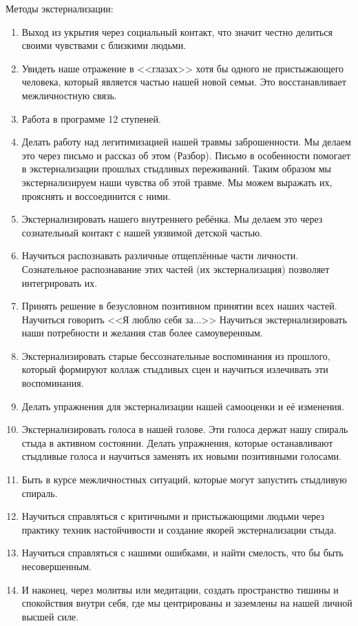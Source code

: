 \documentclass[10pt, fleqn]{article}
\begin{document}
Методы экстернализации:
\begin{enumerate}
\item Выход из укрытия через социальный контакт, что значит честно делиться своими чувствами с близкими людьми.
\item Увидеть наше отражение в <<глазах>> хотя бы одного не пристыжающего человека, который является частью нашей новой семьи. Это восстанавливает межличностную связь.
\item Работа в программе 12 ступеней.
\item Делать работу над легитимизацией нашей травмы заброшенности. Мы делаем это через письмо и рассказ об этом (Разбор). Письмо в особенности помогает в экстернализации прошлых стыдливых переживаний. Таким образом мы экстернализируем наши чувства об этой травме. Мы можем выражать их, прояснять и воссоединится с ними.
\item Экстернализировать нашего внутреннего ребёнка. Мы делаем это через сознательный контакт с нашей уязвимой детской частью. 
\item Научиться распознавать различные отщеплённые части личности. Сознательное распознавание этих частей (их экстернализация) позволяет интегрировать их.
\item Принять решение в безусловном позитивном принятии всех наших частей. Научиться говорить <<Я люблю себя за...>> Научиться экстернализировать наши потребности и желания став более самоуверенным.
\item Экстернализировать старые бессознательные воспоминания из прошлого, который формируют коллаж стыдливых сцен и научиться излечивать эти воспоминания.
\item Делать упражнения для экстернализации нашей самооценки и её изменения.
\item Экстернализировать голоса в нашей голове. Эти голоса держат нашу спираль стыда в активном состоянии. Делать упражнения, которые останавливают стыдливые голоса и научиться заменять их новыми позитивными голосами.
\item Быть в курсе межличностных ситуаций, которые могут запустить стыдливую спираль. 
\item Научиться справляться с критичными и пристыжающими людьми через практику техник настойчивости и создание якорей экстернализации стыда.
\item Научиться справляться с нашими ошибками, и найти смелость, что бы быть несовершенным.
\item И наконец, через молитвы или медитации, создать пространство тишины и спокойствия внутри себя, где мы центрированы и заземлены на нашей личной высшей силе.
\end{enumerate}
\end{document}
